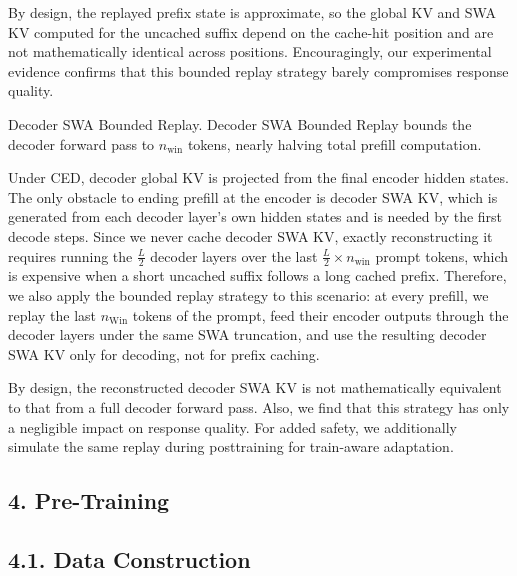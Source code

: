 \documentclass[
  10
]{article}
\begin{document}
By design, the replayed prefix state is approximate, so the global KV
and SWA KV computed for the uncached suffix depend on the cache-hit
position and are not mathematically identical across positions.
Encouragingly, our experimental evidence confirms that this bounded
replay strategy barely compromises response quality.

Decoder SWA Bounded Replay. Decoder SWA Bounded Replay bounds the
decoder forward pass to \(n _ { \mathrm { w i n } }\) tokens, nearly
halving total prefill computation.

Under CED, decoder global KV is projected from the final encoder hidden
states. The only obstacle to ending prefill at the encoder is decoder
SWA KV, which is generated from each decoder layer's own hidden states
and is needed by the first decode steps. Since we never cache decoder
SWA KV, exactly reconstructing it requires running the
\(\frac { L } { 2 }\) decoder layers over the last
\(\frac { L } { 2 } \times n _ { \mathrm { w i n } }\) prompt tokens,
which is expensive when a short uncached suffix follows a long cached
prefix. Therefore, we also apply the bounded replay strategy to this
scenario: at every prefill, we replay the last
\(n _ { \mathrm { W i n } }\) tokens of the prompt, feed their encoder
outputs through the decoder layers under the same SWA truncation, and
use the resulting decoder SWA KV only for decoding, not for prefix
caching.

By design, the reconstructed decoder SWA KV is not mathematically
equivalent to that from a full decoder forward pass. Also, we find that
this strategy has only a negligible impact on response quality. For
added safety, we additionally simulate the same replay during
posttraining for train-aware adaptation.

\subsection{4. Pre-Training}\label{pre-training}

\subsection{4.1. Data Construction}\label{data-construction}
\end{document}
